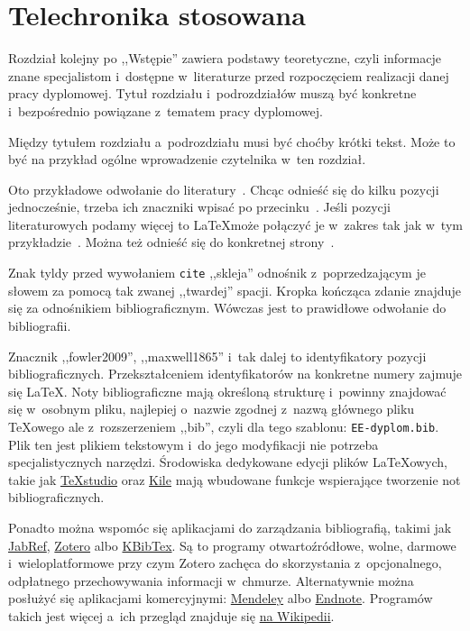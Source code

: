 \chapter{Telechronika stosowana}

Rozdział kolejny po ,,Wstępie'' zawiera podstawy teoretyczne, czyli informacje znane specjalistom i~dostępne w~literaturze przed rozpoczęciem realizacji danej pracy dyplomowej. Tytuł rozdziału i~podrozdziałów muszą być konkretne i~bezpośrednio powiązane z~tematem pracy dyplomowej.

Między tytułem rozdziału a~podrozdziału musi być choćby krótki tekst. Może to być na przykład ogólne wprowadzenie czytelnika w~ten rozdział.

Oto przykładowe odwołanie do literatury~\cite{fowler2009}. Chcąc odnieść się do kilku pozycji jednocześnie, trzeba ich znaczniki wpisać po przecinku~\cite{maxwell1865,leksinski1995}. Jeśli pozycji literaturowych podamy więcej to \LaTeX może połączyć je w~zakres tak jak w~tym przykładzie~\cite{fowler2009, maxwell1865, leksinski1995}. Można też odnieść się do konkretnej strony~\cite[s.~38]{leksinski1995}. 

Znak tyldy przed wywołaniem \texttt{cite} ,,skleja'' odnośnik z~poprzedzającym je słowem za pomocą tak zwanej ,,twardej'' spacji. Kropka kończąca zdanie znajduje się za odnośnikiem bibliograficznym. Wówczas jest to prawidłowe odwołanie do bibliografii.

Znacznik ,,fowler2009'', ,,maxwell1865'' i~tak dalej to identyfikatory pozycji bibliograficznych. Przekształceniem identyfikatorów na konkretne numery zajmuje się \LaTeX{}. Noty bibliograficzne mają określoną strukturę i~powinny znajdować się w~osobnym pliku, najlepiej o~nazwie zgodnej z~nazwą głównego pliku \TeX{owego} ale z~rozszerzeniem ,,bib'', czyli dla tego szablonu: \texttt{EE-dyplom.bib}. Plik ten jest plikiem tekstowym i~do jego modyfikacji nie potrzeba specjalistycznych narzędzi. Środowiska dedykowane edycji plików \LaTeX{owych}, takie jak \href{https://www.texstudio.org/}{TeXstudio} oraz \href{https://kile.sourceforge.io/}{Kile} mają wbudowane funkcje wspierające tworzenie not bibliograficznych.

Ponadto można wspomóc się aplikacjami do zarządzania bibliografią, takimi jak \href{https://www.jabref.org/}{JabRef}, \href{https://www.zotero.org/}{Zotero} albo \href{https://userbase.kde.org/KBibTeX}{KBibTex}. Są to programy otwartoźródłowe, wolne, darmowe i~wieloplatformowe przy czym Zotero zachęca do skorzystania z~opcjonalnego, odpłatnego przechowywania informacji w~chmurze. Alternatywnie można posłużyć się aplikacjami komercyjnymi: \href{https://www.mendeley.com/}{Mendeley} albo \href{https://endnote.com/}{Endnote}. Programów takich jest więcej a~ich przegląd znajduje się \href{https://en.wikipedia.org/wiki/Comparison_of_reference_management_software}{na Wikipedii}.

